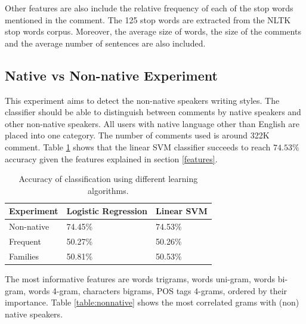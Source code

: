 \documentclass[10pt,a5paper,twoside]{article}
\begin{document}
Other features are also include the relative frequency of each of the stop words
mentioned in the comment. The 125 stop words are extracted from the NLTK stop
words corpus\cite{nltk}. Moreover, the average size of words, the size of the
comments and the average number of sentences are also included.

\subsection{Native vs Non-native Experiment}
\label{exps}
This experiment aims to detect the non-native speakers writing styles. The
classifier should be able to distinguish between comments by native speakers
and other non-native speakers.
All users with native language other than English are placed into one category.
The number of comments used is around 322K comment. Table 
\ref{table:results} shows that the linear SVM classifier succeeds to reach
$74.53\%$ accuracy given the features explained in section \ref{features}.
\begin{table}
  \begin{center}
  \begin{tabular}{l|ll}
	Experiment & Logistic Regression & Linear SVM
	\\\hline
	Non-native & 74.45\% & 74.53\%\\
	Frequent & 50.27\% & 50.26\%\\
	Families & 50.81\% &50.53\% \\
\end{tabular}
\caption{Accuracy of classification using different learning algorithms.}
\label{table:results}
\end{center}
\end{table}

The most informative features are words trigrams, words uni-gram, words bi-gram,
words 4-gram, characters bigrams, POS tags 4-grams, ordered by their importance.
Table \ref{table:nonnative} shows the most correlated grams with (non) native
speakers.
\end{document}

